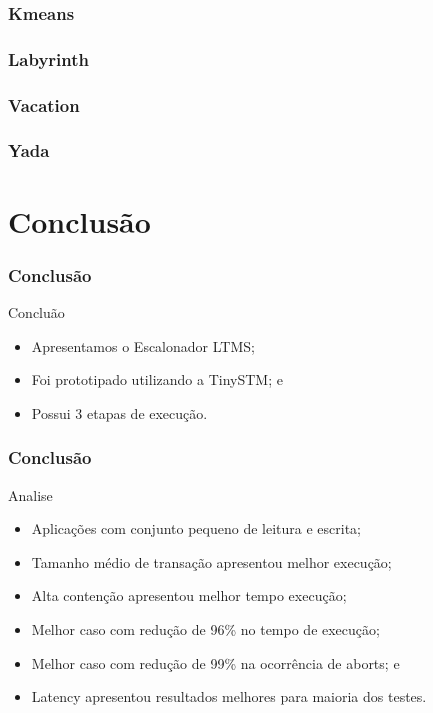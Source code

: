 \documentclass[10pt, pdf,xcolor=pdftex,dvipsnames,table]{beamer}
\begin{document}
\begin{frame} \frametitle{Kmeans}
    
\end{frame}

\begin{frame} \frametitle{Labyrinth}
    
\end{frame}

\begin{frame} \frametitle{Vacation}
    
\end{frame}

\begin{frame} \frametitle{Yada}
    
\end{frame}

\section{Conclusão}
\begin{frame} \frametitle{Conclusão}
    \begin{block}{Concluão}
        \begin{itemize}
        	\item Apresentamos o Escalonador LTMS;
        	\item Foi prototipado utilizando a TinySTM; e
        	\item Possui 3 etapas de execução.
        \end{itemize}
    \end{block}
\end{frame}

\begin{frame} \frametitle{Conclusão}
    \begin{block}{Analise}
        \begin{itemize}
        	\item Aplicações com conjunto pequeno de leitura e escrita;
        	\item Tamanho médio de transação apresentou melhor execução;
        	\item Alta contenção apresentou melhor tempo execução;
        	\item Melhor caso com redução de 96\% no tempo de execução;
        	\item Melhor caso com redução de 99\% na ocorrência de aborts; e
        	\item Latency apresentou resultados melhores para maioria dos testes.
        \end{itemize}
    \end{block}
\end{frame}
\end{document}
